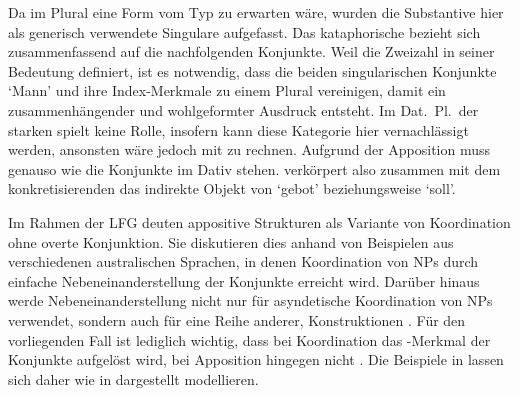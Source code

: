 Da im Plural eine Form vom Typ  zu erwarten wäre, wurden die
Substantive hier als generisch verwendete Singulare
aufgefasst. Das kataphorische  bezieht sich
zusammenfassend auf die nachfolgenden Konjunkte. Weil  die Zweizahl
in seiner Bedeutung definiert, ist es notwendig, dass die beiden singularischen
Konjunkte  `Mann' und  ihre Index-Merkmale zu einem Plural
vereinigen, damit ein zusammenhängender und wohlgeformter Ausdruck entsteht. Im
Dat.~Pl.\ der starken  spielt  keine Rolle,
insofern kann diese Kategorie hier vernachlässigt werden, ansonsten wäre jedoch
mit  zu rechnen. Aufgrund der Apposition
muss  genauso wie die Konjunkte im Dativ stehen. 
verkörpert also zusammen mit dem konkretisierenden  das
indirekte Objekt von  `gebot' beziehungsweise  `soll'.

Im Rahmen der LFG deuten
\citet{sadlernordlinger2006} appositive Strukturen als Variante
von Koordination ohne overte Konjunktion. Sie diskutieren dies anhand von
Beispielen aus verschiedenen australischen Sprachen, in denen Koordination von
NPs durch einfache Nebeneinanderstellung der Konjunkte erreicht wird. Darüber
hinaus werde Nebeneinanderstellung nicht nur für asyndetische Koordination von
NPs verwendet, sondern auch für eine Reihe anderer, 
Konstruktionen \autocite[440--441]{sadlernordlinger2006}. Für
den vorliegenden Fall ist lediglich wichtig, dass bei Koordination das
-Merkmal der Konjunkte aufgelöst wird, bei Apposition hingegen nicht
\autocite[444]{sadlernordlinger2006}. Die Beispiele in
 lassen sich daher wie in
 dargestellt modellieren.

